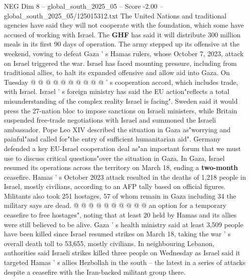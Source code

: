 \begin{textsample}{NEG Dim 8 – global\_south\_2025\_05 – Score -2.00 – global\_south\_2025\_05/125015312.txt}
The United Nations and traditional agencies have said they will not cooperate with the foundation, which some have accused of working with Israel.
The \textbf{GHF} has said it will distribute 300 million meals in its first 90 days of operation.
The army stepped up its offensive at the weekend, vowing to defeat Gaza ' s Hamas rulers, whose October 7, 2023, attack on Israel triggered the war.
Israel has faced mounting pressure, including from traditional allies, to halt its expanded offensive and allow aid into Gaza.
On Tuesday @ @ @ @ @ @ @ @ @ @ ' s cooperation accord, which includes trade, with Israel.
Israel ' s foreign ministry has said the EU action"reflects a total misunderstanding of the complex reality Israel is facing".
Sweden said it would press the 27-nation bloc to impose sanctions on Israeli ministers, while Britain suspended free-trade negotiations with Israel and summoned the Israeli ambassador.
Pope Leo XIV described the situation in Gaza as"worrying and painful"and called for"the entry of sufficient humanitarian aid".
Germany defended a key EU-Israel cooperation deal as"an important forum that we must use to discuss critical questions"over the situation in Gaza.
In Gaza, Israel resumed its operations across the territory on March 18, ending a \textbf{two-month} ceasefire.
Hamas ' s October 2023 attack resulted in the deaths of 1,218 people in Israel, mostly civilians, according to an AFP tally based on official figures.
Militants also took 251 hostages, 57 of whom remain in Gaza including 34 the military says are dead. @ @ @ @ @ @ @ @ @ @ an option for a temporary ceasefire to free hostages", noting that at least 20 held by Hamas and its allies were still believed to be alive.
Gaza ' s health ministry said at least 3,509 people have been killed since Israel resumed strikes on March 18, taking the war ' s overall death toll to 53,655, mostly civilians.
In neighbouring Lebanon, authorities said Israeli strikes killed three people on Wednesday as Israel said it targeted Hamas ' s allies Hezbollah in the south -- the latest in a series of attacks despite a ceasefire with the Iran-backed militant group there.

\end{textsample}

